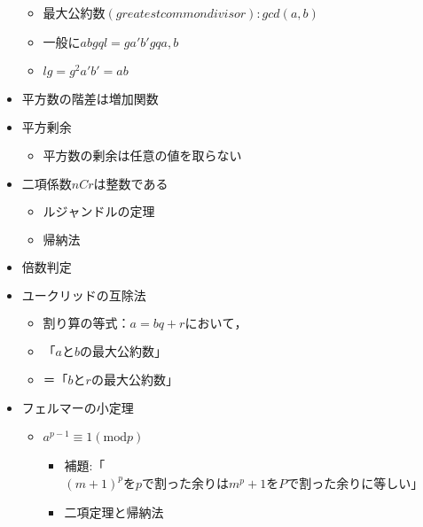 \documentclass[dvipdfmx,uplatex]{jsarticle}
\begin{document}
\begin{itemize}
\begin{itemize}
		\item $ 最大公約数(greatest common divisor): gcd(a,b)$
		\item $ 一般に ab gq l = ga'b' gq a, b$
		\item $ lg = g^2a'b' = ab$
	\end{itemize}
	\item $ 平方数の階差は増加関数$
	\item $ 平方剰余$
	\begin{itemize}
		\item $ 平方数の剰余は任意の値を取らない$
	\end{itemize}
	\item $ 二項係数nCrは整数である$
	\begin{itemize}
		\item $ ルジャンドルの定理$
		\item $ 帰納法$
	\end{itemize}
	\item $ 倍数判定$
	\item $ ユークリッドの互除法$
	\begin{itemize}
		\item $ 割り算の等式：a=bq+r において，$
		\item $ 「a と b の最大公約数」$
		\item $ ＝「b と r の最大公約数」$
	\end{itemize}
	\item $ フェルマーの小定理$
	\begin{itemize}
		\item $ a^{p-1} \equiv 1 ( \mathrm{mod} p)$
		\begin{itemize}
			\item 補題:「$(m+1)^pをpで割った余りはm^p+1をPで割った余りに等しい$」
			\item 二項定理と帰納法
		\end{itemize}
	\end{itemize}
\end{itemize}
\end{document}
